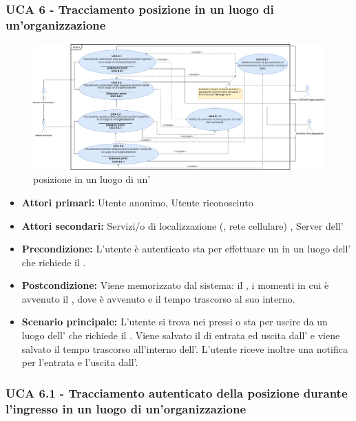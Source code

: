 \subsubsection{UCA 6 - Tracciamento posizione in un luogo di un'organizzazione}%

\begin{figure}[h]
	\centering
	\includegraphics[scale=0.3, center]{Sezioni/UseCase/Immagini/UCA6.png}
	\caption{ posizione in un luogo di un'}
\end{figure}

\begin{itemize}
	\item \textbf{Attori primari:} Utente anonimo, Utente riconosciuto
	\item \textbf{Attori secondari:} Servizi/o di localizzazione (, rete cellulare) , Server  dell'
	\item \textbf{Precondizione:} L'utente è autenticato sta per effettuare un  in un luogo dell' che richiede il .
	\item \textbf{Postcondizione:} Viene memorizzato dal sistema: il , i momenti in cui è avvenuto il , dove è avvenuto e il tempo trascorso al suo interno.
	\item \textbf{Scenario principale:} L'utente si trova nei pressi o sta per uscire da un luogo dell' che richiede il . Viene salvato il  di entrata ed uscita dall' e viene salvato il tempo trascorso all'interno dell'. L'utente riceve inoltre una notifica per l'entrata e l'uscita dall'.
\end{itemize}

\subsubsection{UCA 6.1 - Tracciamento autenticato della posizione durante l'ingresso in un luogo di un'organizzazione}

